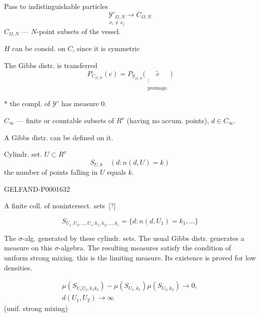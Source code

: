 Pass to indistinguishable particles
\begin{equation*}
\underset{x_i\ne x_j}{\mathcal{Y}'_{\Omega, N}}\longrightarrow C_{\Omega, N}
\end{equation*}
$C_{\Omega, N}$ --- $N$-point subsets of the vessel.

$H$ can be consid. on $C$, since it is symmetric


The Gibbs distr. is transferred
\begin{equation*}
P_{C_{\Omega, N}}(c)=P_{\mathcal{Y}_{\Omega, N}}\bigl (\underset{\substack{\vert\\\text{preimage.}}}{\widetilde c}\bigr)
\end{equation*}


* the compl. of $\mathcal{Y}'$ has measure $0$.


$C_\infty$ --- finite or countable subsets of $R^\nu$ (having no accum. points), $d\in C_\infty$.

A Gibbs distr. can be defined on it.



Cylindr. set. $U\subset R^\nu$
\begin{equation*}
S_{U, k}\quad (d: n (d, U)=k)
\end{equation*}
the number of points falling in $U$ equals $k$.

\begin{GelfandAdjacentEvidence}{GELFAND-P000163}{2}

A finite coll. of nonintersect. sets\, [?]
\end{GelfandAdjacentEvidence}

\begin{equation*}
S_{U_1, U_2,\ldots, U_s; k_1, k_2,\ldots, k_s}=\{d: n (d, U_1)=k_1,\ldots\}
\end{equation*}


The $\sigma$-alg. generated by these cylindr. sets.
The usual Gibbs distr. generates a measure on this $\sigma$-algebra.
The resulting measures satisfy the condition of uniform strong mixing. this is the limiting measure. Its existence is proved for low densities.


\begin{gather*}
\mu (S_{U_1U_2, k_1k_2})-\mu (S_{U_1, k_1})\mu (S_{U_2, k_2})\longrightarrow0,\\
d (U_1, U_2)\longrightarrow\infty
\end{gather*}
(unif. strong mixing)

